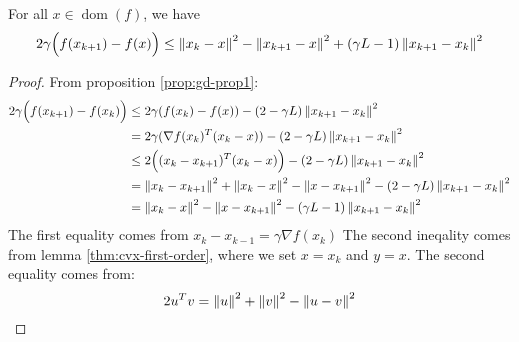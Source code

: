 \begin{proposition}
    \label{prop:gd-prop2}
    For all $x\in\operatorname{dom}(f)$, we have
    \begin{equation*}
        2\gamma\Big( f(x_{k+1})-f(x) \Big) \le \left\lVert x_k - x\right\rVert^2 - \left\lVert x_{k+1} - x\right\rVert^2 + (\gamma L - 1)\left\lVert x_{k+1} - x_k\right\rVert^2
    \end{equation*}
\end{proposition}
\begin{proof}
    From proposition \ref{prop:gd-prop1}:
    \begin{equation*}
    \begin{aligned}
        2\gamma\Big(f(x_{k+1}) - f(x_k)\Big) &\le 2\gamma(f(x_k) - f(x)) - (2-\gamma L)\left\lVert x_{k+1}-x_k\right\rVert^2 \\
        &= 2\gamma(\nabla f(x_k)^T(x_k-x)) - (2-\gamma L)\left\lVert x_{k+1}-x_k\right\rVert^2 \\
        &\le 2\Big( (x_k-x_{k+1})^T(x_k - x) \Big) - (2-\gamma L)\left\lVert x_{k+1}-x_k\right\rVert^2 \\
        &= \left\lVert x_k-x_{k+1}\right\rVert^2 + \left\lVert x_k - x\right\rVert^2 - \left\lVert x-x_{k+1}\right\rVert^2- (2-\gamma L)\left\lVert x_{k+1}-x_k\right\rVert^2 \\
        &= \left\lVert x_k - x\right\rVert^2 - \left\lVert x-x_{k+1}\right\rVert^2- (\gamma L-1)\left\lVert x_{k+1}-x_k\right\rVert^2 \\
    \end{aligned}
    \end{equation*}
    The first equality comes from $x_k - x_{k-1} = \gamma\nabla f(x_k)$
    The second ineqality comes from lemma \ref{thm:cvx-first-order}, where we set $x=x_k$ and $y=x$. The second equality comes from:
    \begin{equation*}
        2u^Tv = \left\lVert u\right\rVert^2 + \left\lVert v\right\rVert^2 - \left\lVert u-v\right\rVert^2
    \end{equation*}
\end{proof}

